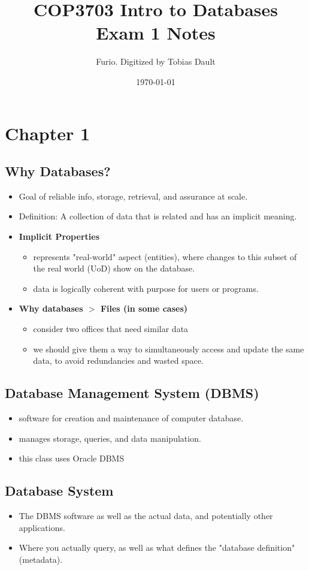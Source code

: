 \documentclass[12pt]{report}
\title{\textbf{COP3703 Intro to Databases\\Exam 1 Notes}}
\author{Furio. Digitized by Tobias Dault}
\date{\today}
\begin{document}
	
	\maketitle
	\tableofcontents
	\thispagestyle{empty}
	
	\chapter{Chapter 1}
	\section{Why Databases?}
	\begin{itemize}
		\item Goal of reliable info, storage, retrieval, and assurance at scale.
		\item Definition: A collection of data that is related and has an implicit meaning.
		\item \textbf{Implicit Properties}
		\begin{itemize}
			\item represents "real-world" aspect (entities), where changes to this subset of the real world (UoD) show on the database.
			\item data is logically coherent with purpose for users or programs.
		\end{itemize}
		\item \textbf{Why databases $>$ Files (in some cases)}
		\begin{itemize}
			\item consider two offices that need similar data
			\item we should give them a way to simultaneously access and update the same data, to avoid redundancies and wasted space.
		\end{itemize}
	\end{itemize}
	\section{Database Management System (DBMS)}
	\begin{itemize}
		\item software for creation and maintenance of computer database.
		\item manages storage, queries, and data manipulation.
		\item this class uses Oracle DBMS
	\end{itemize}
	\section{Database System}
	\begin{itemize}
		\item The DBMS software as well as the actual data, and potentially other applications.
		\item Where you actually query, as well as what defines the "database definition" (metadata).
	\end{itemize}
	
\end{document}
